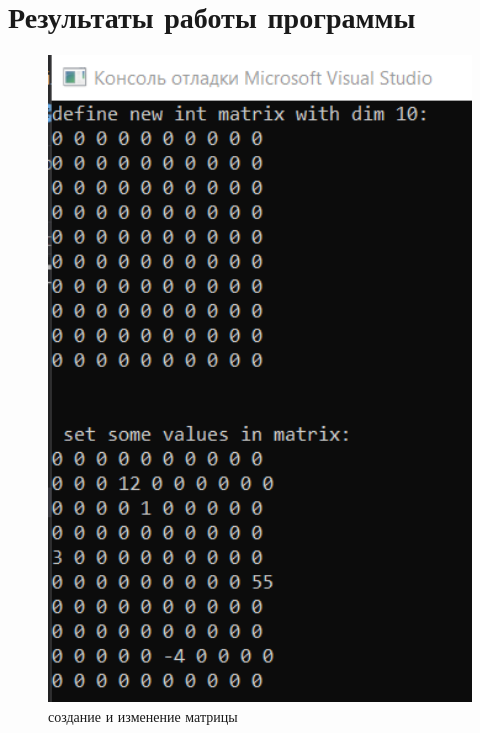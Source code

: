 ﻿\documentclass[a4paper, 12pt]{extarticle}
\begin{document}
\section{Результаты работы программы}
\begin{figure}[H]
    \centering
    \includegraphics[width=400pt]{Test.png}
    \caption{создание и изменение матрицы}
    \label{fig:my_label}
\end{figure}
\end{document}
